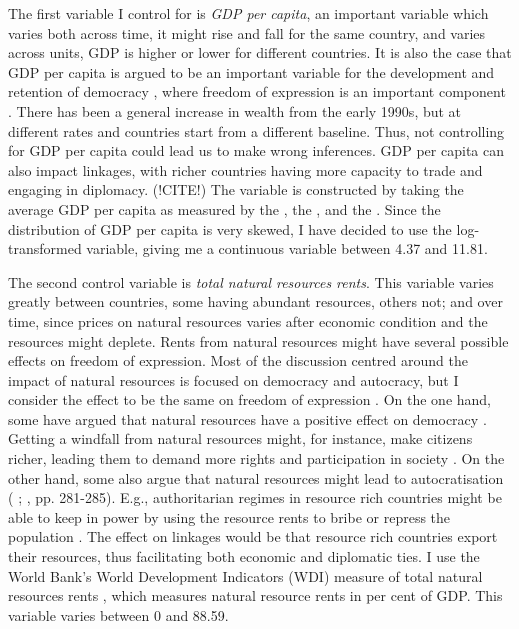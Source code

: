 The first variable I control for is \textit{GDP per capita}, an important variable which varies both across time, it might rise and fall for the same country, and varies across units, GDP is higher or lower for different countries. It is also the case that GDP per capita is argued to be an important variable for the development and retention of democracy \citep{lipset_social_1959, przeworski_modernization_1997}, where freedom of expression is an important component \citep[p. 71]{lipset_social_1959}. There has been a general increase in wealth from the early 1990s, but at different rates and countries start from a different baseline. Thus, not controlling for GDP per capita could lead us to make wrong inferences. GDP per capita can also impact linkages, with richer countries having more capacity to trade and engaging in diplomacy. (!CITE!) The variable is constructed by taking the average GDP per capita as measured by the \citet{world_bank_world_2025}, the \citet{imf_world_2025}, and the \citet{united_nations_statistics_division_national_2025}. Since the distribution of GDP per capita is very skewed, I have decided to use the log-transformed variable, giving me a continuous variable between 4.37 and 11.81. 

The second control variable is \textit{total natural resources rents}. This variable varies greatly between countries, some having abundant resources, others not; and over time, since prices on natural resources varies after economic condition and the resources might deplete. Rents from natural resources might have several possible effects on freedom of expression. Most of the discussion centred around the impact of natural resources is focused on democracy and autocracy, but I consider the effect to be the same on freedom of expression \citep{lipset_social_1959}. On the one hand, some have argued that natural resources have a positive effect on democracy \citep{brooks_oil_2016, haber_natural_2011}. Getting a windfall from natural resources might, for instance, make citizens richer, leading them to demand more rights and participation in society \citep{brooks_oil_2016, lipset_social_1959}. On the other hand, some also argue that natural resources might lead to autocratisation (\citeauthor{andersen_big_2014} \citeyear{andersen_big_2014}; \citeauthor{brooks_oil_2016} \citeyear{brooks_oil_2016}, pp. 281-285). E.g., authoritarian regimes in resource rich countries might be able to keep in power by using the resource rents to bribe or repress the population \citep[p. 282]{brooks_oil_2016}. The effect on linkages would be that resource rich countries export their resources, thus facilitating both economic and diplomatic ties. I use the World Bank's World Development Indicators (WDI) measure of total natural resources rents \citet{world_bank_world_2025}, which measures natural resource rents in per cent of GDP. This variable varies between 0 and 88.59. 

